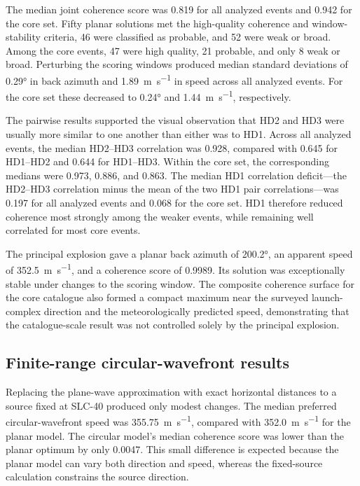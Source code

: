 \documentclass[]{seismica}
\begin{document}
The median joint coherence score was 0.819 for all analyzed events and 0.942 for
the core set. Fifty planar solutions met the high-quality coherence and
window-stability criteria, 46 were classified as probable, and 52 were weak or
broad. Among the core events, 47 were high quality, 21 probable, and only 8 weak
or broad. Perturbing the scoring windows produced median standard deviations of
\ang{0.29} in back azimuth and \SI{1.89}{\metre\per\second} in speed across all
analyzed events. For the core set these decreased to \ang{0.24} and
\SI{1.44}{\metre\per\second}, respectively.

The pairwise results supported the visual observation that HD2 and HD3 were
usually more similar to one another than either was to HD1. Across all analyzed
events, the median HD2--HD3 correlation was 0.928, compared with 0.645 for
HD1--HD2 and 0.644 for HD1--HD3. Within the core set, the corresponding medians
were 0.973, 0.886, and 0.863. The median HD1 correlation deficit---the HD2--HD3
correlation minus the mean of the two HD1 pair correlations---was 0.197 for all
analyzed events and 0.068 for the core set. HD1 therefore reduced coherence most
strongly among the weaker events, while remaining well correlated for most core
events.

The principal explosion gave a planar back azimuth of \ang{200.2}, an apparent
speed of \SI{352.5}{\metre\per\second}, and a coherence score of 0.9989. Its
solution was exceptionally stable under changes to the scoring window. The
composite coherence surface for the core catalogue also formed a compact maximum
near the surveyed launch-complex direction and the meteorologically predicted
speed, demonstrating that the catalogue-scale result was not controlled solely
by the principal explosion.


\subsection{Finite-range circular-wavefront results}
\label{sec:results_finite_range}

Replacing the plane-wave approximation with exact horizontal distances to a
source fixed at SLC-40 produced only modest changes. The median preferred
circular-wavefront speed was \SI{355.75}{\metre\per\second}, compared with
\SI{352.0}{\metre\per\second} for the planar model. The circular model's median
coherence score was lower than the planar optimum by only 0.0047. This small
difference is expected because the planar model can vary both direction and
speed, whereas the fixed-source calculation constrains the source direction.
\end{document}
